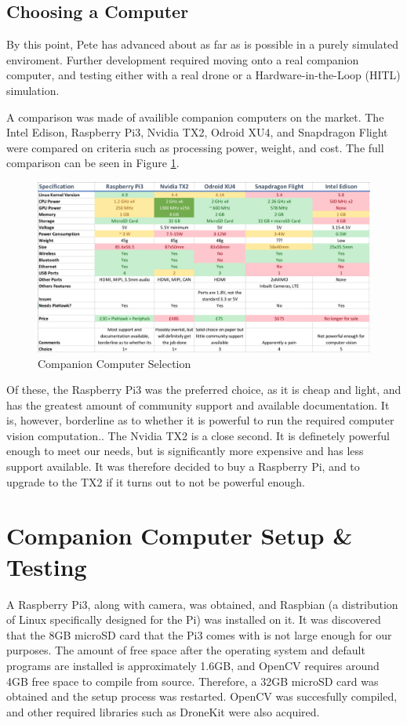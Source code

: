 \documentclass[11pt]{article}
\begin{document}
\subsection{Choosing a Computer} \label{cc_selection}
By this point, Pete has advanced about as far as is possible in a purely simulated enviroment. Further development required moving onto a real companion computer, and testing either with a real drone or a Hardware-in-the-Loop (HITL) simulation.

A comparison was made of availible companion computers on the market. The Intel Edison, Raspberry Pi3, Nvidia TX2, Odroid XU4, and Snapdragon Flight were compared on criteria such as processing power, weight, and cost. The full comparison can be seen in Figure \ref{fig:cc_selection}.

\begin{figure}[h]
    \includegraphics[width=\linewidth]{companion_computer_comparison}
    \caption{Companion Computer Selection} \label{fig:cc_selection}
\end{figure}

Of these, the Raspberry Pi3 was the preferred choice, as it is cheap and light, and has the greatest amount of community support and available documentation. It is, however, borderline as to whether it is powerful to run the required computer vision computation.\cite{companion_computer_power}. The Nvidia TX2 is a close second. It is definetely powerful enough to meet our needs, but is significantly more expensive and has less support available. It was therefore decided to buy a Raspberry Pi, and to upgrade to the TX2 if it turns out to not be powerful enough.


\section{Companion Computer Setup \& Testing}
A Raspberry Pi3, along with camera, was obtained, and Raspbian (a distribution of Linux specifically designed for the Pi) was installed on it. It was discovered that the 8GB microSD card that the Pi3 comes with is not large enough for our purposes. The amount of free space after the operating system and default programs are installed is approximately 1.6GB, and OpenCV requires around 4GB free space to compile from source. Therefore, a 32GB microSD card was obtained and the setup process was restarted. OpenCV was succesfully compiled, and other required libraries such as DroneKit were also acquired.
\end{document}
